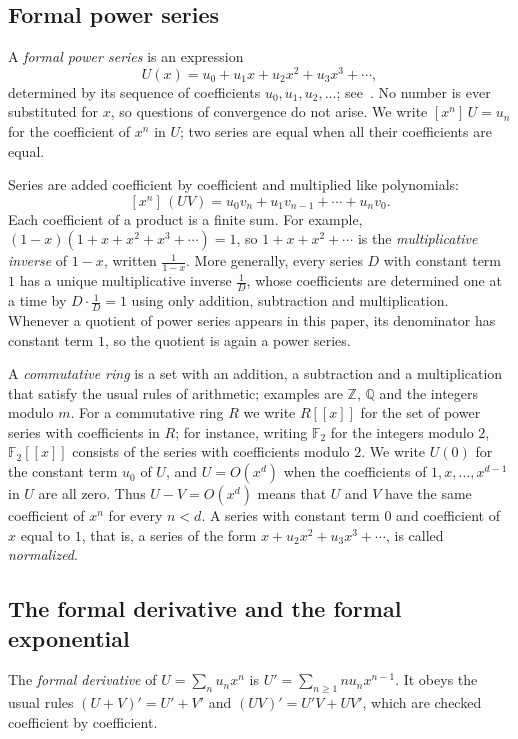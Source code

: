 \documentclass[11pt,a4paper]{article}
\theoremstyle{definition}
\theoremstyle{remark}
\newcommand{\Z}{\mathbb{Z}}
\newcommand{\Q}{\mathbb{Q}}
\newcommand{\F}{\mathbb{F}}
\newcommand{\ps}[1]{#1[[x]]}
\newcommand{\coeff}[2]{[x^{#1}]\,#2}
\begin{document}
\subsection{Formal power series}
A \emph{formal power series} is an expression
\[
U(x)=u_0+u_1x+u_2x^2+u_3x^3+\cdots ,
\]
determined by its sequence of coefficients $u_0,u_1,u_2,\dots$; see~\cite{niven,stanley}. No number is ever
substituted for $x$, so questions of convergence do not arise. We write $\coeff{n}{U}=u_n$ for the coefficient of $x^n$ in $U$; two series are equal
when all their coefficients are equal.

Series are added coefficient by coefficient and multiplied like polynomials:
\[
\coeff{n}{(UV)}=u_0v_n+u_1v_{n-1}+\cdots+u_nv_0 .
\]
Each coefficient of a product is a finite sum. For example, $(1-x)(1+x+x^2+x^3+\cdots)=1$, so $1+x+x^2+\cdots$ is
the \emph{multiplicative inverse} of $1-x$, written $\frac{1}{1-x}$. More generally, every series $D$ with constant term
$1$ has a unique multiplicative inverse $\frac1D$, whose coefficients are determined one at a time by $D\cdot\frac1D=1$
using only addition, subtraction and multiplication. Whenever a quotient of power series appears in this paper, its
denominator has constant term $1$, so the quotient is again a power series.

A \emph{commutative ring} is a set with an addition, a subtraction and a multiplication that satisfy the usual rules
of arithmetic; examples are $\Z$, $\Q$ and the integers modulo $m$. For a commutative ring $R$ we write $\ps{R}$ for
the set of power series with coefficients in $R$; for instance, writing $\F_2$ for the integers modulo $2$, $\ps{\F_2}$
consists of the series with coefficients modulo $2$. We write
$U(0)$ for the constant term $u_0$ of $U$, and $U=O(x^d)$ when the coefficients of $1,x,\dots,x^{d-1}$ in $U$ are all
zero. Thus $U-V=O(x^d)$ means that $U$ and $V$ have the same coefficient of $x^n$ for every $n<d$. A series with
constant term $0$ and coefficient of $x$ equal to $1$, that is, a series of the form $x+u_2x^2+u_3x^3+\cdots$, is
called \emph{normalized}.

\subsection{The formal derivative and the formal exponential}
The \emph{formal derivative} of $U=\sum_nu_nx^n$ is $U'=\sum_{n\ge1}nu_nx^{n-1}$. It obeys the usual rules
$(U+V)'=U'+V'$ and $(UV)'=U'V+UV'$, which are checked coefficient by coefficient.
\end{document}
